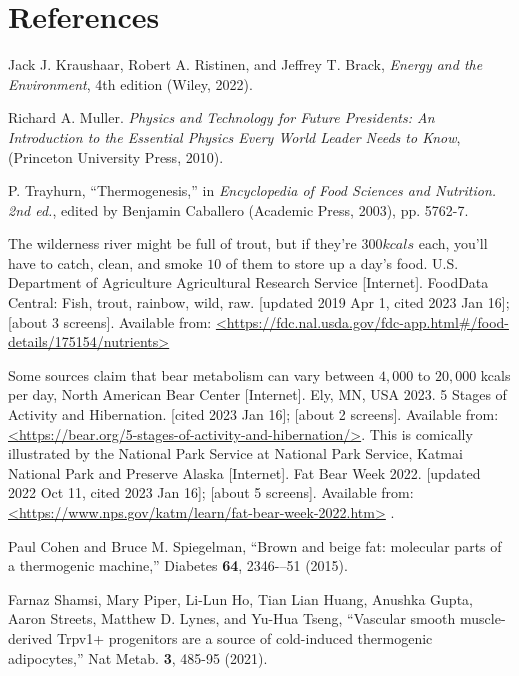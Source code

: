 \documentclass[prb,preprint]{revtex4-2}
\begin{document}
\section*{References}
\begin{thebibliography}{99}

Jack J. Kraushaar, Robert A. Ristinen, and Jeffrey T. Brack,
\textit{Energy and the Environment}, 
4th edition
(Wiley, 2022).

Richard A. Muller.
\textit{Physics and Technology for Future Presidents: An Introduction to the Essential Physics Every World Leader Needs to Know},
(Princeton University Press, 2010).

P. Trayhurn,
``Thermogenesis,''
in \textit{Encyclopedia of Food Sciences and Nutrition. 2nd ed.},
edited by Benjamin Caballero 
(Academic Press, 2003), pp. 5762-7.

The wilderness river might be full of trout, but if they're $300kcals$ each, you'll have to catch, clean, and smoke $10$ of them to store up a day's food.
U.S. Department of Agriculture Agricultural Research Service [Internet].
FoodData Central: Fish, trout, rainbow, wild, raw.
[updated 2019 Apr 1, cited 2023 Jan 16]; [about 3 screens].
Available from: \url{<https://fdc.nal.usda.gov/fdc-app.html#/food-details/175154/nutrients>}

Some sources claim that bear metabolism can vary between $4,000$ to $20,000$ kcals per day, 
North American Bear Center [Internet]. 
Ely, MN, USA 2023. 
5 Stages of Activity and Hibernation.
[cited 2023 Jan 16]; [about 2 screens].
Available from: \url{<https://bear.org/5-stages-of-activity-and-hibernation/>}.
%
This is comically illustrated by the National Park Service at 
National Park Service, Katmai National Park and Preserve Alaska [Internet].
Fat Bear Week 2022.
[updated 2022 Oct 11, cited 2023 Jan 16]; [about 5 screens].
Available from: \url{<https://www.nps.gov/katm/learn/fat-bear-week-2022.htm>} .


Paul Cohen and Bruce M. Spiegelman,
``Brown and beige fat: molecular parts of a thermogenic machine,''
Diabetes
\textbf{64},
2346-–51
(2015).

Farnaz Shamsi, Mary Piper, Li-Lun Ho, Tian Lian Huang, Anushka Gupta, Aaron Streets, Matthew D. Lynes, and Yu-Hua Tseng, 
``Vascular smooth muscle-derived Trpv1+ progenitors are a source of cold-induced thermogenic adipocytes,''
Nat Metab.
\textbf{3}, 485-95 (2021).


\end{thebibliography}
\end{document}
